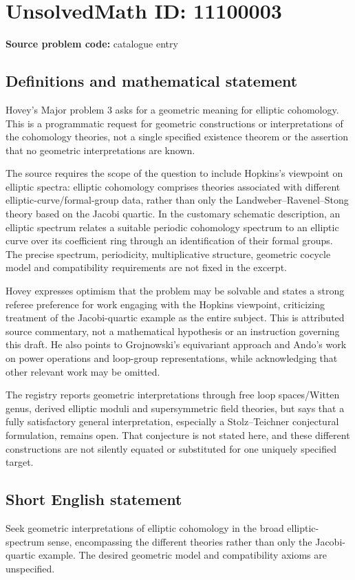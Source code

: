 \documentclass[11pt]{article}
\begin{document}
\section*{UnsolvedMath ID: 11100003}
\textbf{Source problem code:} catalogue entry
\subsection{Definitions and mathematical statement}
Hovey's Major problem 3 asks for a geometric meaning for elliptic cohomology. This is a programmatic request for geometric constructions or interpretations of the cohomology theories, not a single specified existence theorem or the assertion that no geometric interpretations are known.

The source requires the scope of the question to include Hopkins's viewpoint on elliptic spectra: elliptic cohomology comprises theories associated with different elliptic-curve/formal-group data, rather than only the Landweber--Ravenel--Stong theory based on the Jacobi quartic. In the customary schematic description, an elliptic spectrum relates a suitable periodic cohomology spectrum to an elliptic curve over its coefficient ring through an identification of their formal groups. The precise spectrum, periodicity, multiplicative structure, geometric cocycle model and compatibility requirements are not fixed in the excerpt.

Hovey expresses optimism that the problem may be solvable and states a strong referee preference for work engaging with the Hopkins viewpoint, criticizing treatment of the Jacobi-quartic example as the entire subject. This is attributed source commentary, not a mathematical hypothesis or an instruction governing this draft. He also points to Grojnowski's equivariant approach and Ando's work on power operations and loop-group representations, while acknowledging that other relevant work may be omitted.

The registry reports geometric interpretations through free loop spaces/Witten genus, derived elliptic moduli and supersymmetric field theories, but says that a fully satisfactory general interpretation, especially a Stolz--Teichner conjectural formulation, remains open. That conjecture is not stated here, and these different constructions are not silently equated or substituted for one uniquely specified target.
\subsection{Short English statement}
Seek geometric interpretations of elliptic cohomology in the broad elliptic-spectrum sense, encompassing the different theories rather than only the Jacobi-quartic example. The desired geometric model and compatibility axioms are unspecified.
\end{document}
